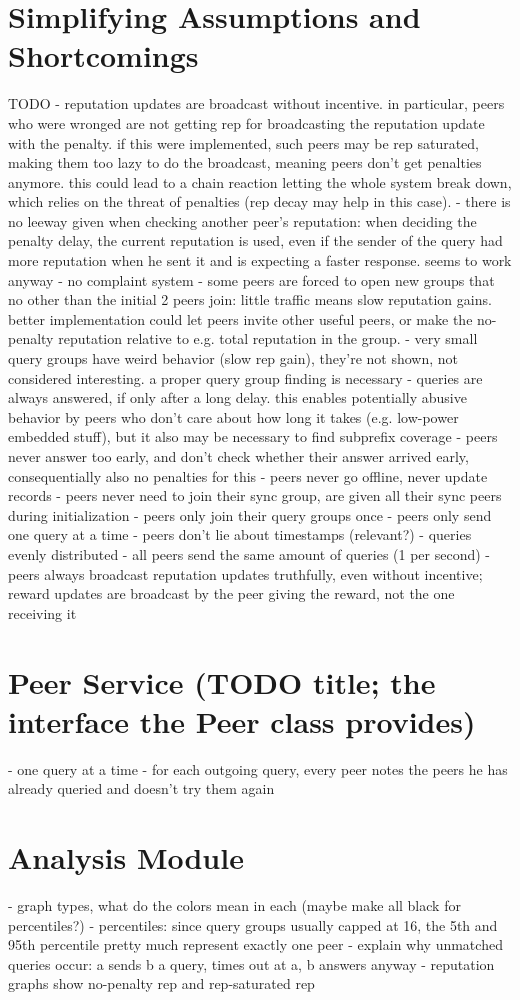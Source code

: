 \section{Simplifying Assumptions and Shortcomings}
TODO
- reputation updates are broadcast without incentive. in particular, peers who
  were wronged are not getting rep for broadcasting the reputation update with
  the penalty. if this were implemented, such peers may be rep saturated, making
  them too lazy to do the broadcast, meaning peers don't get penalties anymore.
  this could lead to a chain reaction letting the whole system break down, which
  relies on the threat of penalties (rep decay may help in this case).
- there is no leeway given when checking another peer's reputation: when
  deciding the penalty delay, the current reputation is used, even if the sender
  of the query had more reputation when he sent it and is expecting a faster
  response. seems to work anyway
- no complaint system
- some peers are forced to open new groups that no other than the initial 2
  peers join: little traffic means slow reputation gains.
  better implementation could let peers invite other useful peers, or make the
  no-penalty reputation relative to e.g. total reputation in the group.
- very small query groups have weird behavior (slow rep gain), they're not
  shown, not considered interesting. a proper query group finding is necessary
- queries are always answered, if only after a long delay. this enables
  potentially abusive behavior by peers who don't care about how long it takes
  (e.g. low-power embedded stuff), but it also may be necessary to find
  subprefix coverage
- peers never answer too early, and don't check whether their answer arrived
  early, consequentially also no penalties for this
- peers never go offline, never update records
- peers never need to join their sync group, are given all their sync peers
  during initialization
- peers only join their query groups once
- peers only send one query at a time
- peers don't lie about timestamps (relevant?)
- queries evenly distributed
- all peers send the same amount of queries (1 per second)
- peers always broadcast reputation updates truthfully, even without incentive;
  reward updates are broadcast by the peer giving the reward, not the one
  receiving it

\section{Peer Service (TODO title; the interface the Peer class provides)}
- one query at a time
- for each outgoing query, every peer notes the peers he has already queried and
  doesn't try them again
\section{Analysis Module}
- graph types, what do the colors mean in each (maybe make all black for
  percentiles?)
- percentiles: since query groups usually capped at 16, the 5th and 95th
  percentile pretty much represent exactly one peer
- explain why unmatched queries occur: a sends b a query, times out at a, b
  answers anyway
- reputation graphs show no-penalty rep and rep-saturated rep
